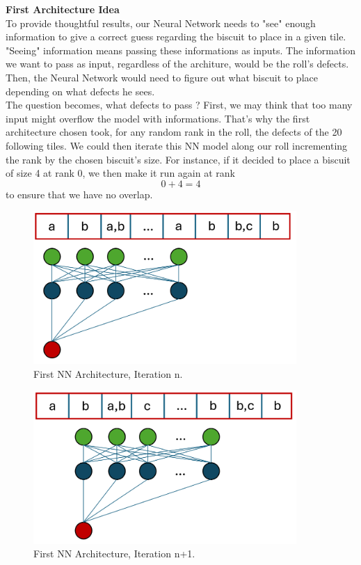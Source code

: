 \documentclass{modeleRapport}
\begin{document}
\textbf{First Architecture Idea}\\

To provide thoughtful results, our Neural Network needs to "see" enough information to give a correct guess regarding the
biscuit to place in a given tile. "Seeing" information means passing these informations as inputs. The information we want
to pass as input, regardless of the architure, would be the roll's defects. Then, the Neural Network would need to figure
out what biscuit to place depending on what defects he sees.\\

The question becomes, what defects to pass ? First, we may think that too many input might overflow the model with informations.
That's why the first architecture chosen took, for any random rank in the roll, the defects of the 20 following tiles. We could
then iterate this NN model along our roll incrementing the rank by the chosen biscuit's size. For instance, if it decided to
place a biscuit of size 4 at rank 0, we then make it run again at rank \[ 0+4=4 \] to ensure that we have no overlap.\\

\begin{figure}[H]
    \centering
    \includegraphics[width=10cm]{Images/NN_V1_A.png}
    \caption{First NN Architecture, Iteration n.}
\end{figure}

\begin{figure}[H]
    \centering
    \includegraphics[width=10cm]{Images/NN_V1_B.png}
    \caption{First NN Architecture, Iteration n+1.}
\end{figure}
\end{document}
